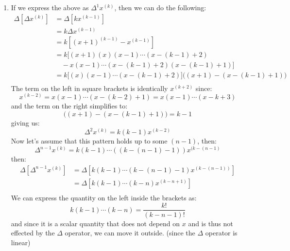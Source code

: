\documentclass[12pt,letterpaper]{article}
\theoremstyle{definition}
\begin{document}
\begin{changemargin}{.5cm}{0cm}
\begin{enumerate}[label=(\roman*)]
    \item If we express the above as $\Delta^1 x^{(k)}$, then we can do the following:
    \begin{align*}
        \Delta\left[\Delta x^{(k)}\right] &= \Delta \left[ kx^{(k-1)} \right]\\
        &= k \Delta x^{(k-1)}\\
        &= k \left[(x+1)^{(k-1)} - x^{(k-1)}\right]\\
        &= k \Big[ (x+1)(x)(x-1)\cdots(x-(k-1)+2)\\
        &\quad- x(x-1)\cdots(x-(k-1)+2)(x-(k-1)+1)  \Big]\\
        &= k\Big[ (x)(x-1)\cdots(x-(k-1)+2)\Big] \Big( (x+1) -(x-(k-1)+1) \Big)\\
    \end{align*}
    The term on the left in square brackets is identically $x^{(k+2)}$ since:
    \begin{equation*}
        x^{(k-2)} = x(x-1)\cdots (x-(k-2)+1) = x(x-1)\cdots (x-k+3)
    \end{equation*}
    and the term on the right simplifies to:
    \begin{equation*}
        \Big( (x+1) -(x-(k-1)+1) \Big)= k-1
    \end{equation*}
    giving us:
    \begin{equation*}
        \Delta^2x^{(k)} = k(k-1)x^{(k-2)}
    \end{equation*}
    Now let's assume that this pattern holds up to some $(n-1)$, then:
    \begin{equation*}
        \Delta^{n-1} x^{(k)} = k(k-1)\cdots((k-(n-1)-1))x^{(k-(n-1)}
    \end{equation*}
    then:
    \begin{align*}
        \Delta\left[\Delta^{n-1}x^{(k)}\right] &= \Delta\left[k(k-1)\cdots(k-(n-1)-1)x^{(k-(n-1))}\right]\\
        &= \Delta\left[k(k-1)\cdots(k-n)x^{(k-n+1)}\right]\\
    \end{align*}
    We can express the quantity on the left inside the brackets as:
    \begin{equation}\label{eq:factorial}
        k(k-1)\cdots(k-n)= \dfrac{k!}{(k-n-1)!}
    \end{equation}
    and since it is a scalar quantity that does not depend on $x$ and is thus not effected by the $\Delta$ operator, we can move it outside. (since the $\Delta$ operator is linear)

\end{enumerate}
\end{changemargin}
\end{document}
